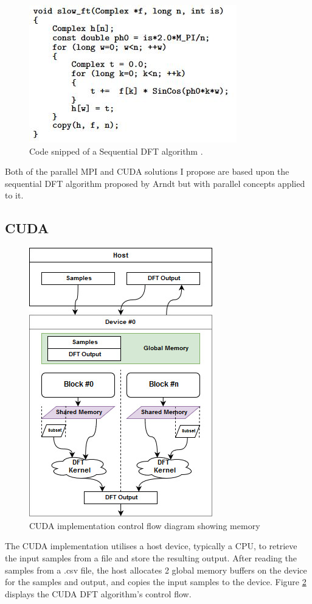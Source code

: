 \documentclass[11pt,a4paper]{article}
\begin{document}
\begin{figure}[H]
\begin{center}
\includegraphics[scale=0.6]{code_dft_afp}
\end{center}
\caption{Code snipped of a Sequential DFT algorithm \citep{arndt2002algorithms}.}
\label{fig:code_dft_afp}
\end{figure}

Both of the parallel MPI and CUDA solutions I propose are based upon the sequential DFT algorithm proposed by Arndt \citep{arndt2002algorithms} but with parallel concepts applied to it.

\subsection{CUDA}

\begin{figure}
\begin{center}
\includegraphics[scale=0.6]{cuda_impl1}
\end{center}
\caption{CUDA implementation control flow diagram showing memory }
\label{fig:cuda_impl1}
\end{figure}
The CUDA implementation utilises a host device, typically a CPU, to retrieve the input samples from a file and store the resulting output.   After reading the samples from a .csv file, the host allocates 2 global memory buffers on the device for the samples and output, and copies the input samples to the device.  Figure \ref{fig:cuda_impl1} displays the CUDA DFT algorithm's control flow.
\end{document}

